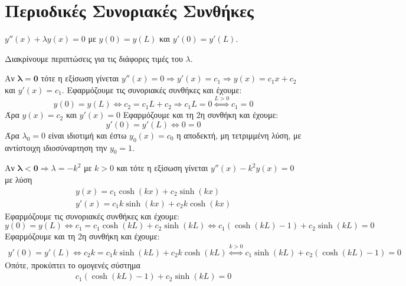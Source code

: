 \documentclass[a4paper,table]{report}
\begin{document}
\section*{Περιοδικές Συνοριακές Συνθήκες}


\begin{mybox3}
\begin{example}
  $ y''(x) + \lambda y(x)=0 $ με $ y(0)=y(L) $ και $ y'(0)=y'(L) $.
\end{example}
\end{mybox3}
\begin{solution}
  Διακρίνουμε περιπτώσεις για τις διάφορες τιμές του $ \lambda $.
  \begin{myitemize}
    \item Αν $ \bm{\lambda = 0} $ τότε η εξίσωση γίνεται 
      $ y''(x)=0 \Rightarrow y'(x) = c_{1} \Rightarrow y(x) = c_{1}x + c_{2} $ και 
      $ y'(x) = c_{1} $. 
      Εφαρμόζουμε τις συνοριακές συνθήκες και έχουμε:
      \[
        y(0)=y(L) \Leftrightarrow c_{2}= c_{1}L + c_{2} \Rightarrow c_{1}L=0
        \overset{L>0}{\Leftrightarrow} c_{1} = 0
      \] 
      Άρα $ y(x) = c_{2} $ και $ y'(x) = 0 $
      Εφαρμόζουμε και τη 2η συνθήκη και έχουμε:
      \[
        y'(0)=y'(L) \Leftrightarrow 0 = 0
      \]
      Άρα $ \lambda_{0}=0 $ είναι ιδιοτιμή και έστω $ y_{0}(x)=c_{0} $ η αποδεκτή, 
      μη τετριμμένη λύση, με αντίστοιχη ιδιοσύναρτηση την $y_{0}=1 $. 
    \item Αν $ \bm{\lambda < 0} \Rightarrow \lambda = -k^{2} $ με $ k>0 $ και τότε η 
      εξίσωση γίνεται $ y''(x) -k^{2}y(x)=0$ με λύση 
      \begin{align*} 
        y(x) = c_{1} \cosh{(kx)} + c_{2} \sinh{(kx)} \\
        y'(x) = c_{1}k \sinh{(kx)} + c_{2}k \cosh{(kx)} 
      \end{align*}
      Εφαρμόζουμε τις συνοριακές συνθήκες και έχουμε:
      \[
        y(0)=y(L) \Leftrightarrow  c_{1} = c_{1} \cosh{(kL)} + c_{2} \sinh{(kL)} 
        \Leftrightarrow c_{1}(\cosh{(kL)} -1) + c_{2} \sinh{(kL)} = 0
      \] 
      Εφαρμόζουμε και τη 2η συνθήκη και έχουμε:
      \begin{gather*}
        y'(0)=y'(L) \Leftrightarrow c_{2}k = c_{1}k \sinh{(kL)} + c_{2}k \cosh{(kL)} 
        \overset{k > 0}{\Leftrightarrow} 
         c_{1} \sinh{(kL)} + c_{2} (\cosh{(kL)} -1) = 0
      \end{gather*}
      Οπότε, προκύπτει το ομογενές σύστημα 
      \[
        \left.
          \begin{matrix}
            c_{1}(\cosh{(kL)} -1) + c_{2} \sinh{(kL)} = 0 \\

\end{matrix}\]
\end{myitemize}
\end{solution}
\end{document}
